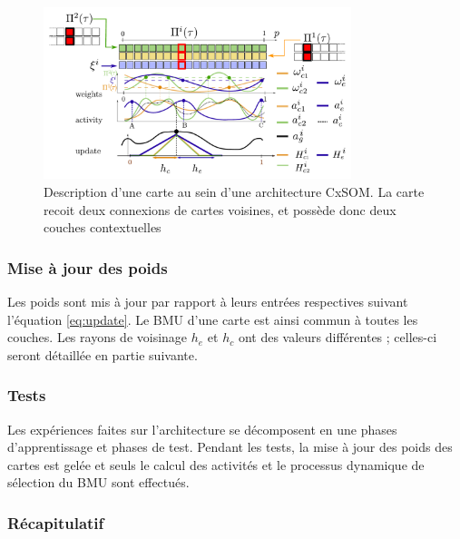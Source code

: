 \begin{figure}
\centering
\includegraphics[width=0.8\textwidth]{one_map.pdf}
\caption{Description d'une carte au sein d'une architecture CxSOM. La carte recoit deux connexions de cartes voisines, et possède donc deux couches contextuelles}
\label{fig:one_map}
\end{figure}

\subsubsection{Mise à jour des poids}

Les poids sont mis à jour par rapport à leurs entrées respectives suivant l'équation \ref{eq:update}. Le BMU d'une carte est ainsi commun à toutes les couches. Les rayons de voisinage $h_e$ et $h_c$ ont des valeurs différentes ; celles-ci seront détaillée en partie suivante. 

\subsubsection{Tests}

Les expériences faites sur l'architecture se décomposent en une phases d'apprentissage et phases de test. Pendant les tests, la mise à jour des poids des cartes est gelée et seuls le calcul des activités et le processus dynamique de sélection du BMU sont effectués.

\subsubsection{Récapitulatif}

